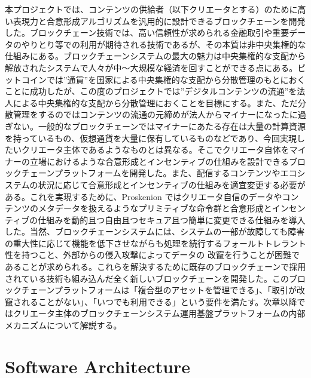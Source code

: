 本プロジェクトでは、コンテンツの供給者（以下クリエータとする）のために高い表現力と合意形成アルゴリズムを汎用的に設計できるブロックチェーンを開発した。ブロックチェーン技術では、高い信頼性が求められる金融取引や重要データのやりとり等での利用が期待される技術であるが、その本質は非中央集権的な仕組みにある。ブロックチェーンシステムの最大の魅力は中央集権的な支配から解放されたシステムで人々が中〜大規模な経済を回すことができる点にある。ビットコインでは''通貨''を国家による中央集権的な支配から分散管理のもとにおくことに成功したが、この度のプロジェクトでは''デジタルコンテンツの流通''を法人による中央集権的な支配から分散管理におくことを目標にする。また、ただ分散管理をするのではコンテンツの流通の元締めが法人からマイナーになったに過ぎない。一般的なブロックチェーンではマイナーにあたる存在は大量の計算資源を持っているもの、仮想通貨を大量に保有しているものなどであり、今回実現したいクリエータ主体であるようなものとは異なる。そこでクリエータ自体をマイナーの立場におけるような合意形成とインセンティブの仕組みを設計できるブロックチェーンプラットフォームを開発した。また、配信するコンテンツやエコシステムの状況に応じて合意形成とインセンティブの仕組みを適宜変更する必要がある。これを実現するために、Proskenion
ではクリエータ自信のデータやコンテンツのメタデータを扱えるようなプリミティブな命令群と合意形成とインセンティブの仕組みを動的且つ自由且つセキュア且つ簡単に変更できる仕組みを導入した。当然、ブロックチェーンシステムには、システムの一部が故障しても障害の重大性に応じて機能を低下させながらも処理を続行するフォールトトレラント性を持つこと、外部からの侵入攻撃によってデータの
改竄を行うことが困難であることが求められる。これらを解決するために既存のブロックチェーンで採用されている技術も組み込んだ全く新しいブロックチェーンを開発した。このブロックチェーンプラットフォームは「複合型のアセットを管理できる」、「取引が改竄されることがない」、「いつでも利用できる」という要件を満たす。次章以降ではクリエータ主体のブロックチェーンシステム運用基盤プラットフォームの内部メカニズムについて解説する。

\hypertarget{software-architecture}{%
\section{Software Architecture}\label{software-architecture}}

